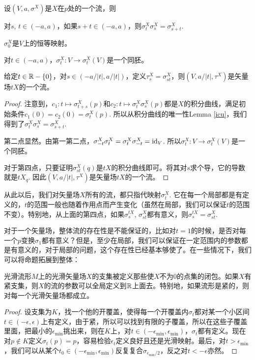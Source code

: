 \begin{pro}
设$(V,a,\sigma^X)$是$X$在$p$处的一个流，则
\begin{compactenum}
\item 对$s$, $t\in (-a,a)$，如果$s+t\in (-a,a)$，则$\sigma^X_t\sigma^X_s=\sigma^X_{s+t}$.
\item $\sigma^X_0$是$V$上的恒等映射。
\item 对$t\in (-a,a)$，$\sigma^X_t:V\to \sigma^X_t(V)$是一个同胚。
\item 给定$t\in \mathbb{R}-\{0\}$，对$s\in (-a/|t|,a/|t|)$，定义$\tau^X_{s}=\sigma^X_{st}$，则$(V,a/|t|,\tau^X)$是矢量场$tX$的一个流。
\end{compactenum}
\end{pro}

\begin{proof}
注意到，$c_1:t\mapsto \sigma_{t+s}^X(p)$和$c_2:t\mapsto \sigma^X_t\sigma^X_s(p)$都是$X$的积分曲线，满足初始条件$c_1(0)=c_2(0)=\sigma_{t}^X(p)$. 所以从积分曲线的唯一性Lemma \ref{icu}，我们得到了$\sigma^X_t\sigma^X_s=\sigma^X_{s+t}$.

第二点显然。由第一第二点，$\sigma^X_{-t}\sigma^X_{t}=\sigma^X_{t}\sigma^X_{-t}=\operatorname{id}_V$. 所以$\sigma^X_t:V\to \sigma^X_t(V)$是一个同胚。

对于第四点，只要证明$\sigma^X_{st}(q)$是$tX$的积分曲线即可。将其对$s$求个导，它的导数就是$tX_q$. 因此$(V,a/|t|,\tau^X)$是矢量场$tX$的一个流。
\end{proof}

从此以后，我们对矢量场$X$所有的流，都只指代映射$\sigma^X_t$. 它在每一个局部都是有定义的，$t$的范围一般也随着作用点而产生变化（虽然在局部，我们可以保证$t$的范围不变）。特别地，从上面的第四点，如果$\sigma^{tX}_s$, $\sigma^{X}_{st}$都有意义，则$\sigma^{tX}_s=\sigma^{X}_{st}$.

对于一个矢量场，整体流的存在性是不能保证的，比如对$t=1$的时候，是否对每一个$p$变换$\sigma_1$都有意义？但是，至少在局部，我们可以保证在一定范围内的参数都是有意义的，对于局部的问题，这个存在性已经基本够使了。在一些情况下，我们可以将命题拓展到整体：

\begin{pro}
光滑流形$M$上的光滑矢量场$X$的支集被定义那些使$X$不为$0$的点集的闭包。如果$X$有紧支集，则$X$的流的参数可以全局定义到$\mathbb{R}$上面去。特别地，如果流形是紧的，则对每一个光滑矢量场都成立。
\end{pro}

\begin{proof}
设支集为$K$，找一个他的开覆盖，使得每一个开覆盖内$\sigma_t$都对某一个小区间$t\in (-\epsilon,\epsilon)$上有定义，由于紧，所以可以找到有限的子覆盖，所以在这些子覆盖里面，把最小的$\epsilon_{\text{min}}$挑出来，则在$K$上，对$t\in(-\epsilon_{\text{min}},\epsilon_{\text{min}})$，$\sigma_t$都有定义。现在对$p\notin K$定义$\sigma_t(p)=p$，容易检验$\epsilon_t$定义良好且还是光滑映射。最后，对$t>\epsilon_{\text{min}}$，我们可以从某个$t_0\in (-\epsilon_{\text{min}},\epsilon_{\text{min}})$反复复合$\sigma_{\epsilon_{\text{min}}/2}$，反之对$t<-\epsilon$亦然。
\end{proof}


